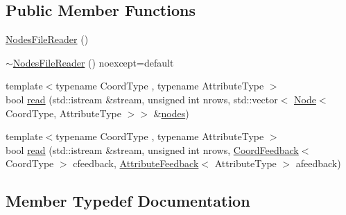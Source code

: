 \subsection*{Public Member Functions}
\begin{DoxyCompactItemize}
\item 
\mbox{\hyperlink{classdisplace_1_1formats_1_1legacy_1_1_nodes_file_reader_a9389e8c073a3fbc5ea9ed306ebd9f1c1}{Nodes\+File\+Reader}} ()
\item 
\mbox{\hyperlink{classdisplace_1_1formats_1_1legacy_1_1_nodes_file_reader_ab773a604fd817577971bdc89d5c5ccd9}{$\sim$\+Nodes\+File\+Reader}} () noexcept=default
\item 
{\footnotesize template$<$typename Coord\+Type , typename Attribute\+Type $>$ }\\bool \mbox{\hyperlink{classdisplace_1_1formats_1_1legacy_1_1_nodes_file_reader_a76425d199a81c7472a2e69f339d3f388}{read}} (std\+::istream \&stream, unsigned int nrows, std\+::vector$<$ \mbox{\hyperlink{classdisplace_1_1formats_1_1legacy_1_1_nodes_file_reader_a366283f07d187605ddd50f9ca7f9872a}{Node}}$<$ Coord\+Type, Attribute\+Type $>$$>$ \&\mbox{\hyperlink{thread__vessels_8cpp_ace5675146c8515428d094fd142d8a2d2}{nodes}})
\item 
{\footnotesize template$<$typename Coord\+Type , typename Attribute\+Type $>$ }\\bool \mbox{\hyperlink{classdisplace_1_1formats_1_1legacy_1_1_nodes_file_reader_a06dd01500dc63c99141f74f049ccc2b2}{read}} (std\+::istream \&stream, unsigned int nrows, \mbox{\hyperlink{classdisplace_1_1formats_1_1legacy_1_1_nodes_file_reader_afafb20437b7e3bf2a9b6c63c3eb030e3}{Coord\+Feedback}}$<$ Coord\+Type $>$ cfeedback, \mbox{\hyperlink{classdisplace_1_1formats_1_1legacy_1_1_nodes_file_reader_aaace2a27c97ca3c31e9a177d4776afc8}{Attribute\+Feedback}}$<$ Attribute\+Type $>$ afeedback)
\end{DoxyCompactItemize}


\subsection{Member Typedef Documentation}
\mbox{\label{classdisplace_1_1formats_1_1legacy_1_1_nodes_file_reader_aaace2a27c97ca3c31e9a177d4776afc8}} 
